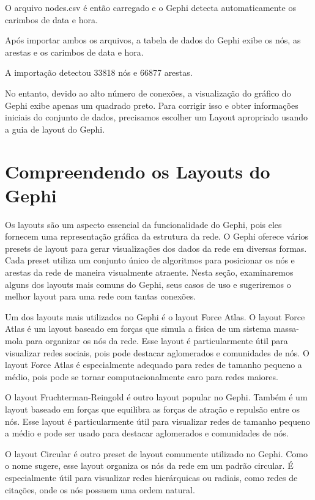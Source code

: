 O arquivo nodes.csv é então carregado e o Gephi detecta automaticamente os carimbos de data e hora.

Após importar ambos os arquivos, a tabela de dados do Gephi exibe os nós, as arestas e os carimbos de data e hora.

A importação detectou 33818 nós e 66877 arestas.

No entanto, devido ao alto número de conexões, a visualização do gráfico do Gephi exibe apenas um quadrado preto. Para corrigir isso e obter informações iniciais do conjunto de dados, precisamos escolher um Layout apropriado usando a guia de layout do Gephi.

\section{Compreendendo os Layouts do Gephi}

Os layouts são um aspecto essencial da funcionalidade do Gephi, pois eles fornecem uma representação gráfica da estrutura da rede. O Gephi oferece vários presets de layout para gerar visualizações dos dados da rede em diversas formas. Cada preset utiliza um conjunto único de algoritmos para posicionar os nós e arestas da rede de maneira visualmente atraente. Nesta seção, examinaremos alguns dos layouts mais comuns do Gephi, seus casos de uso e sugeriremos o melhor layout para uma rede com tantas conexões.

Um dos layouts mais utilizados no Gephi é o layout Force Atlas. O layout Force Atlas é um layout baseado em forças que simula a física de um sistema massa-mola para organizar os nós da rede. Esse layout é particularmente útil para visualizar redes sociais, pois pode destacar aglomerados e comunidades de nós. O layout Force Atlas é especialmente adequado para redes de tamanho pequeno a médio, pois pode se tornar computacionalmente caro para redes maiores.

O layout Fruchterman-Reingold é outro layout popular no Gephi. Também é um layout baseado em forças que equilibra as forças de atração e repulsão entre os nós. Esse layout é particularmente útil para visualizar redes de tamanho pequeno a médio e pode ser usado para destacar aglomerados e comunidades de nós.

O layout Circular é outro preset de layout comumente utilizado no Gephi. Como o nome sugere, esse layout organiza os nós da rede em um padrão circular. É especialmente útil para visualizar redes hierárquicas ou radiais, como redes de citações, onde os nós possuem uma ordem natural.

